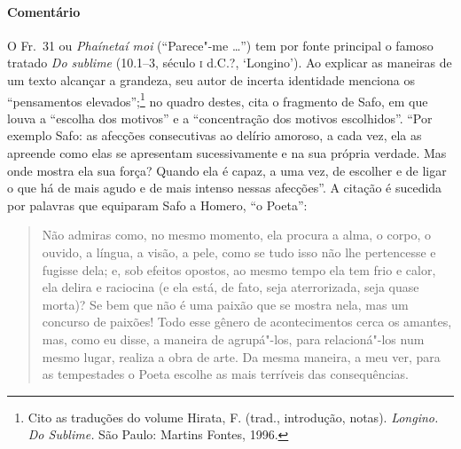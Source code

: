 {{\paragraph{Comentário} O Fr.~31 ou \textit{Phaínetaí moi} (“Parece"-me \ldots{}”) tem por fonte
principal o famoso tratado \textit{Do sublime} (10.1--3, século \textsc{i} d.C.?, `Longino'). Ao
explicar as maneiras de um texto alcançar a grandeza, seu autor de incerta identidade menciona os
“pensamentos elevados”;\footnote{ Cito as traduções do volume Hirata,
F. (trad., introdução, notas). \textit{Longino.} \textit{Do Sublime.} São
Paulo: Martins Fontes, 1996.} no quadro destes, cita o fragmento de Safo,
em que louva a “escolha dos motivos” e a “concentração dos
motivos escolhidos”. ``Por exemplo Safo: as afecções consecutivas ao delírio
amoroso, a cada vez, ela as apreende como elas se apresentam sucessivamente e
na sua própria verdade. Mas onde mostra ela sua força? Quando ela é capaz, a
uma vez, de escolher e de ligar o que há de mais agudo e de mais
intenso nessas afecções”. A citação é sucedida por palavras que equiparam Safo
a Homero, “o Poeta”: 
\pagebreak
\begin{quote}
Não admiras como, no mesmo momento, ela
procura a alma, o corpo, o ouvido, a língua, a visão, a pele, como se tudo isso
não lhe pertencesse e fugisse dela; e, sob efeitos opostos, ao mesmo tempo ela
tem frio e calor, ela delira e raciocina (e ela está, de fato, seja
aterrorizada, seja quase morta)? Se bem que não é uma paixão que se mostra
nela, mas um concurso de paixões! Todo esse gênero de acontecimentos cerca os
amantes, mas, como eu disse, a maneira de agrupá"-los, para relacioná"-los num
mesmo lugar, realiza a obra de arte. Da mesma maneira, a meu ver, para as
tempestades o Poeta escolhe as mais terríveis das consequências.
\end{quote}

}}
